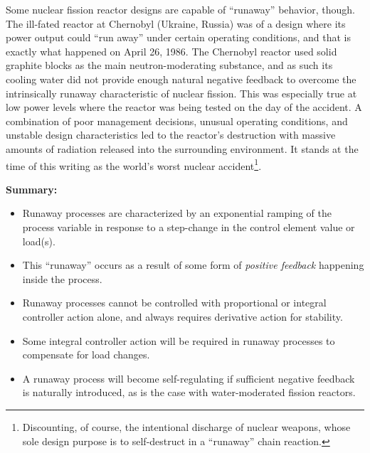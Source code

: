 Some nuclear fission reactor designs are capable of ``runaway'' behavior, though.  The ill-fated reactor at Chernobyl (Ukraine, Russia) was of a design where its power output could ``run away'' under certain operating conditions, and that is exactly what happened on April 26, 1986.  The Chernobyl reactor used solid graphite blocks as the main neutron-moderating substance, and as such its cooling water did not provide enough natural negative feedback to overcome the intrinsically runaway characteristic of nuclear fission.  This was especially true at low power levels where the reactor was being tested on the day of the accident.  A combination of poor management decisions, unusual operating conditions, and unstable design characteristics led to the reactor's destruction with massive amounts of radiation released into the surrounding environment.  It stands at the time of this writing as the world's worst nuclear accident\footnote{Discounting, of course, the intentional discharge of nuclear weapons, whose sole design purpose is to self-destruct in a ``runaway'' chain reaction.}.  


\vskip 10pt

\noindent
\textbf{Summary:}

\begin{itemize}
\item Runaway processes are characterized by an exponential ramping of the process variable in response to a step-change in the control element value or load(s).
\item This ``runaway'' occurs as a result of some form of \textit{positive feedback} happening inside the process.
\item Runaway processes cannot be controlled with proportional or integral controller action alone, and always requires derivative action for stability.
\item Some integral controller action will be required in runaway processes to compensate for load changes.
\item A runaway process will become self-regulating if sufficient negative feedback is naturally introduced, as is the case with water-moderated fission reactors.
\end{itemize}









